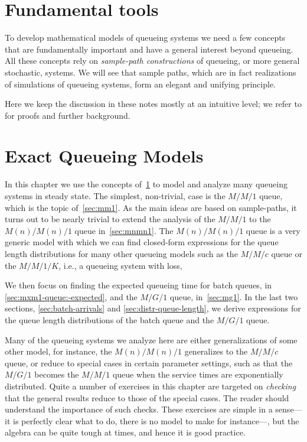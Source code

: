 \chapter{Fundamental tools}
\label{cha:fundamental-tools}


To develop mathematical models of queueing systems we need a few concepts that are fundamentally important and have a general interest beyond queueing.
All these concepts rely on \emph{sample-path constructions} of queueing, or more general stochastic, systems.
We will see that sample paths, which are in fact realizations of simulations of queueing systems, form an elegant and unifying principle.

Here we keep the discussion in these notes mostly at an intuitive level; we refer to \cite{el-taha98:_sampl_path_analy_queuein_system} for proofs and further background.








\chapter{Exact Queueing Models}
\label{cha:analytical-models}

In this chapter we use the concepts of~\cref{cha:fundamental-tools} to model and analyze many queueing systems in steady state.
The simplest, non-trivial, case is the $M/M/1$ queue, which is the topic of~\cref{sec:mm1}.
As the main ideas are based on sample-paths, it turns out to be  nearly trivial to extend the analysis of the $M/M/1$ to the $M(n)/M(n)/1$ queue in~\cref{sec:mnmn1}.
The $M(n)/M(n)/1$ queue is a very generic model  with which we can find closed-form expressions for the queue length distributions for many other queueing models such as the $M/M/c$ queue or the $M/M/1/K$, i.e., a queueing system with loss,

We then focus on finding the expected queueing time for batch queues, in \cref{sec:mxm1-queue:-expected}, and the $M/G/1$ queue, in~\cref{sec:mg1}. 
In the last two sections,  \cref{sec:batch-arrivals} and \cref{sec:distr-queue-length}, we derive expressions for the queue length distributions of the batch queue and the $M/G/1$ queue. 

Many of the queueing systems we analyze here are either generalizations of some other model, for instance, the $M(n)/M(n)/1$ generalizes to the $M/M/c$ queue, or reduce to special cases in certain parameter settings, such as that the $M/G/1$ becomes the $M/M/1$ queue when the service times are exponentially distributed.
Quite a number of exercises in this chapter are targeted on \emph{checking} that the general results reduce to those of the special cases.
The reader should understand the importance of such checks.
These exercises are simple in a sense---it is perfectly clear what to do, there is no model to make for instance---, but the algebra can be quite tough at times, and hence it is good practice.


